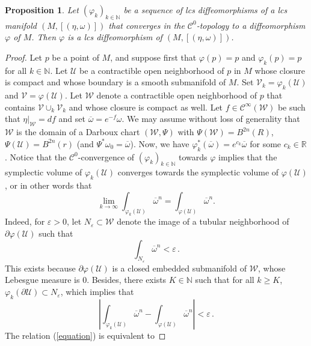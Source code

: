 \documentclass{amsart}
\newcommand{\N}{\mathbb{N}}
\newcommand{\R}{\mathbb{R}}
\newtheorem{prop}[thm]{Proposition}
\theoremstyle{remark}
\begin{document}
\begin{prop}\label{proposition:rigidity}
Let $(\varphi_k)_{k \in \N}$ be a sequence of lcs diffeomorphisms
of a lcs manifold $(M, [(\eta, \omega)])$
that converges in the $\mathcal C^0$-topology
to a diffeomorphism $\varphi$ of $M$.
Then $\varphi$ is a lcs diffeomorphism of $(M, [(\eta, \omega)])$. 
\end{prop}

\begin{proof}
Let $p$ be a point of $M$,
and suppose first that $\varphi(p) = p$ and $\varphi_k(p) = p$ for all $k \in \N$.
Let $\mathcal{U}$ be a contractible open neighborhood of $p$ in $M$
whose closure is compact
and whose boundary is a smooth submanifold of $M$.
Set $\mathcal{V}_k = \varphi_k (\mathcal{U})$
and $\mathcal{V} = \varphi (\mathcal{U})$.
Let $\mathcal{W}$ denote a contractible open neighborhood of $p$
that contains $\mathcal{V} \cup_{k} \mathcal{V}_k$
and whose closure is compact as well.
Let $f \in \mathcal{C}^\infty (\mathcal{W})$
be such that $\eta|_{\mathcal{W}} = df$
and set $\overline{\omega} = e^{-f}\omega$.
We may assume without loss of generality
that $\mathcal{W}$ is the domain of a Darboux chart
$(\mathcal{W}, \Psi)$
with $\Psi (\mathcal{W}) = B^{2n}(R)$,
$\Psi (\mathcal{U}) = B^{2n}(r)$
(and $\Psi^*\omega_0 = \overline{\omega}$).
Now, 
we have $\varphi_k^*(\overline{\omega}) = e^{c_k} \overline{\omega}$
for some $c_k \in \R$.
Notice that the $\mathcal{C}^0$-convergence of $(\varphi_k)_{k \in \N}$ towards $\varphi$
implies that the symplectic volume of $\varphi_k (\mathcal{U})$
converges towards the symplectic volume of $\varphi(\mathcal{U})$,
or in other words that 
\begin{equation}\label{equation}
\lim_{k \to \infty} \int_{\varphi_k (\mathcal{U})} \overline{\omega}^n
= \int_{\varphi (\mathcal{U})}\overline{\omega}^n.
\end{equation}
Indeed, for $\varepsilon > 0$,
let $N_\varepsilon \subset \mathcal{W}$ denote
the image of a tubular neighborhood of $\partial \varphi(\mathcal{U})$
such that 
$$
\int_{N_\varepsilon} \overline{\omega}^n < \varepsilon \,.
$$
This exists because $\partial \varphi(\mathcal{U})$
is a closed embedded submanifold of $\mathcal{W}$,
whose Lebesgue measure is $0$.
Besides, there exists $K \in \N$ such that for all $k \geq K$,
$\varphi_k (\partial \mathcal{U}) \subset N_\varepsilon$,
which implies that 
$$
\left|\int_{\varphi_k (\mathcal{U})} \overline{\omega}^n
- \int_{\varphi (\mathcal{U})} \overline{\omega}^n\right|
< \varepsilon \,.
$$
The relation (\ref{equation}) is equivalent to 

\end{proof}
\end{document}
